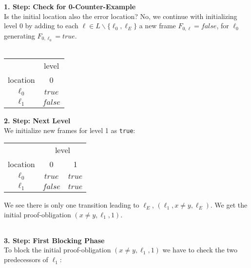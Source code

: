 \documentclass{article}
\begin{document}
	\textbf{1. Step: Check for 0-Counter-Example} \\
	Is the initial location also the error location?
	No, we continue with initializing level 0 by adding to each $\ell \in L \backslash \{\ell_0, \ell_E\}$ a new frame $F_{0, \ell} = false$, for $\ell_0$ generating $F_{0, \ell_0} = true$. \\ \\
	
	
	\setlength\tabcolsep{0.35em}
	\begin{center}
		\begin{tabu}{cc}
			\toprule
			& level \\
			\cmidrule(lr){2-2}
			location & 0 \\
			$\ell_0$ & $true$ \\
			$\ell_1$ & $false$ \\
			\bottomrule
		\end{tabu}
	\end{center}
	
	\hspace*{5cm}
	
	
	\textbf{2. Step: Next Level} \\
	We initialize new frames for level 1 as \texttt{true}: \\
	
	\begin{center}
		\begin{tabu}{ccc}
			\toprule
			& \multicolumn{2}{c}{level} \\ 
			\cmidrule(lr){2-3}
			location & 0 & 1 \\
			\cmidrule{1-3}
			$\ell_0$ & $true$ & $true$ \\
			$\ell_1$ & $false$ & $true$ \\
			\bottomrule
		\end{tabu}
	\end{center}
	
	\hspace*{5cm}
	
	
	We see there is only one transition leading to $\ell_E$, $(\ell_1, x \neq y, \ell_E)$. We get the initial proof-obligation $(x \neq y, \ell_1, 1)$. \\ \\ \par
	\textbf{3. Step: First Blocking Phase} \\
	To block the initial proof-obligation $(x \neq y, \ell_1, 1)$ we have to check the two predecessors of $\ell_1$:
	
\end{document}
